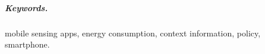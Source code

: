 \documentclass[12pt]{article}
\numberwithin{equation}{section}
\numberwithin{table}{section}
\numberwithin{figure}{section}
\begin{document}


\subparagraph{Keywords.} mobile sensing apps, energy consumption, context information, policy, smartphone.

















\end{document}
